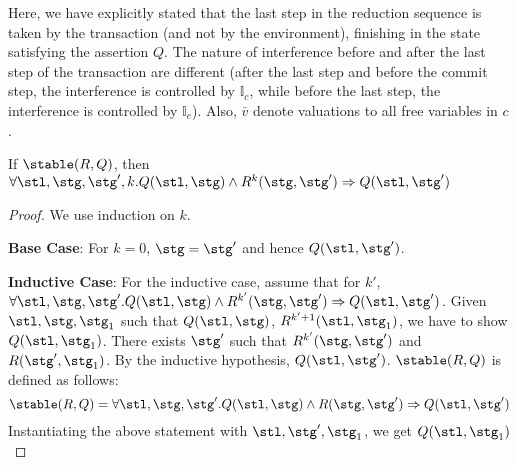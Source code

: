 Here, we have explicitly stated that the last step in the reduction sequence is taken by the transaction (and not by the environment),  finishing in the state satisfying the assertion $Q$. The nature of interference before and after the last step of the transaction are different (after the last step and before the commit step, the interference is controlled by $\mathbb{I}_c$, while before the last step, the interference is controlled by $\mathbb{I}_e$). Also, $\bar{v}$ denote valuations to all free variables in $c$.

\begin{lemma}
If $\stable(R, Q)$, then $\forall \stl, \stg, \stg', k. Q(\stl, \stg) \wedge R^{k}(\stg, \stg') \Rightarrow Q(\stl, \stg')$
\end{lemma}

\begin{proof}
We use induction on $k$. 

\textbf{Base Case}: For $k = 0$, $\stg = \stg'$ and hence $Q(\stl, \stg')$. 

\textbf{Inductive Case}: For the inductive case, assume that for $k'$, $\forall \stl, \stg, \stg'. Q(\stl, \stg) \wedge R^{k'}(\stg, \stg') \Rightarrow Q(\stl, \stg')$.
Given $\stl, \stg, \stg_1$ such that $Q(\stl, \stg)$, $R^{k'+1}(\stl, \stg_1)$, we have to show $Q(\stl, \stg_1)$. There exists $\stg'$ such that $R^{k'}(\stg, \stg')$ and $R(\stg', \stg_1)$. By the inductive hypothesis, $Q(\stl, \stg')$. $\stable(R,Q)$ is defined as follows:
$$
\stable(R,Q) = \forall \stl, \stg, \stg'. Q(\stl, \stg) \wedge R(\stg, \stg') \Rightarrow Q(\stl, \stg')
$$
Instantiating the above statement with $\stl, \stg', \stg_1$, we get $Q(\stl, \stg_1)$
\end{proof}

